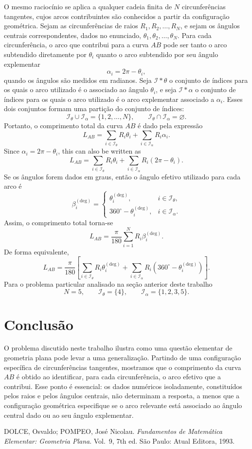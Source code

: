 \documentclass[a4paper,12pt,oneside]{article}
\numberwithin{equation}{section}
\def\be{\begin{equation}}
\def\ee{\end{equation}}
\numberwithin{equation}{section}
\begin{document}
O mesmo raciocínio se aplica a qualquer cadeia finita de $N$ circunferências tangentes, cujos arcos contribuintes são conhecidos a partir da configuração geométrica. Sejam as circunferências de raios $R_1, R_2,\ldots, R_N$, e sejam os ângulos centrais correspondentes, dados no enunciado, $\theta_1, \theta_2, \ldots, \theta_N$. Para cada circunferência, o arco que contribui para a curva $AB$ pode ser tanto o arco subtendido diretamente por $\theta_i$ quanto o arco subtendido por seu ângulo explementar
\be
\alpha_i = 2\pi-\theta_i,
\ee
quando os ângulos são medidos em radianos. Seja $\mathcal{I}*{\theta}$ o conjunto de índices para os quais o arco utilizado é o associado ao ângulo $\theta_i$, e seja $\mathcal{I}*{\alpha}$ o conjunto de índices para os quais o arco utilizado é o arco explementar associado a $\alpha_i$. Esses dois conjuntos formam uma partição do conjunto de índices:
\be
\mathcal{I}_{\theta}\cup \mathcal{I}_{\alpha}=\{1,2,\ldots,N\},
\qquad
\mathcal{I}_{\theta}\cap \mathcal{I}_{\alpha}=\varnothing.
\ee
Portanto, o comprimento total da curva $AB$ é dado pela expressão
\be
L_{AB} = \sum_{i\in\mathcal{I}_{\theta}} R_i\theta_i  + \sum_{i\in\mathcal{I}_{\alpha}} R_i\alpha_i.
\ee
Since $\alpha_i = 2 \pi - \theta_i$, this can also be written as
\be
L_{AB} = \sum_{i\in\mathcal{I}_{\theta}} R_i\theta_i + \sum_{i\in\mathcal{I}_{\alpha}} R_i(2\pi-\theta_i).
\ee
Se os ângulos forem dados em graus, então o ângulo efetivo utilizado para cada arco é
\be
\beta_i^{\mathrm{(deg)}} = 
\begin{cases}
\theta_i^{\mathrm{(deg)}}, & i\in\mathcal{I}_{\theta},\\[4pt] 360^\circ-\theta_i^{\mathrm{(deg)}}, & i\in\mathcal{I}_{\alpha}.
\end{cases}
\ee
Assim, o comprimento total torna-se
\be
L_{AB} = \frac{\pi}{180} \sum_{i=1}^{N} R_i\beta_i^{\mathrm{(deg)}}.
\ee
De forma equivalente,
\be
L_{AB} = \frac{\pi}{180} \left[ \sum_{i \in \mathcal{I}_{\theta}} R_i \theta_i^{\mathrm{(deg)}} + \sum_{i\in\mathcal{I}_{\alpha}}R_i \left(360^\circ-\theta_i^{\mathrm{(deg)}} \right) \right].
\ee
Para o problema particular analisado na seção anterior deste trabalho
\be
N=5, \qquad \mathcal{I}_{\theta}=\{4\}, \qquad \mathcal{I}_{\alpha}=\{1,2,3,5\}.
\ee

\section{Conclusão}

O problema discutido neste trabalho ilustra como uma questão elementar de geometria plana pode levar a uma generalização. Partindo de uma configuração específica de circunferências tangentes, mostramos que o comprimento da curva $AB$ é obtido ao identificar, para cada circunferência, o arco efetivo que a contribui. Esse ponto é essencial: os dados numéricos isoladamente, constituídos pelos raios e pelos ângulos centrais, não determinam a resposta, a menos que a configuração geométrica especifique se o arco relevante está associado ao ângulo central dado ou ao seu ângulo explementar.

\begin{thebibliography}{9}

DOLCE, Osvaldo; POMPEO, José Nicolau. \textit{Fundamentos de Matemática Elementar: Geometria Plana}. Vol.~9, 7th ed. São Paulo: Atual Editora, 1993.

\end{thebibliography}
\end{document}
